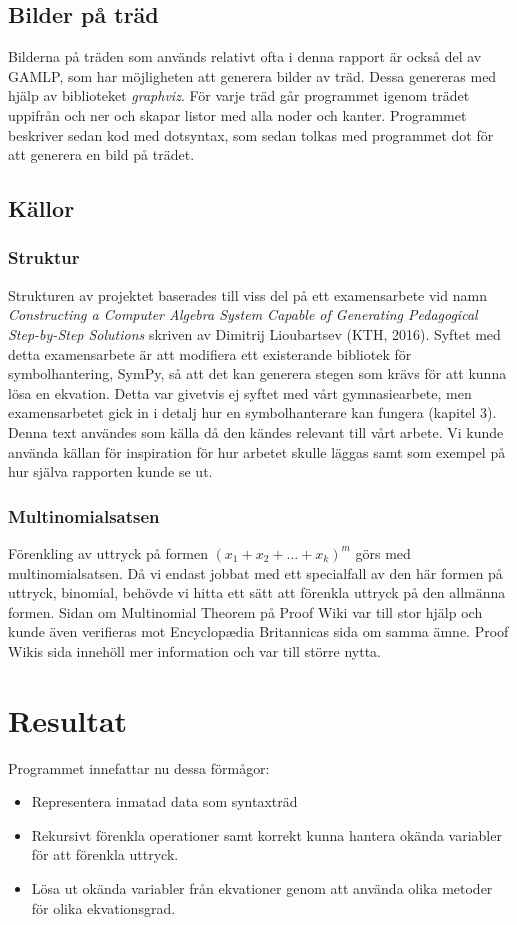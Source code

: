\documentclass[12pt,a4paper]{article}
\begin{document}
\subsection{Bilder på träd}
Bilderna på träden som används relativt ofta i denna rapport är också del av GAMLP, som har möjligheten att generera bilder av träd. Dessa genereras med hjälp av biblioteket \textit{graphviz}. För varje träd går programmet igenom trädet uppifrån och ner och skapar listor med alla noder och kanter. Programmet beskriver sedan kod med dotsyntax, som sedan tolkas med programmet dot för att generera en bild på trädet.

\subsection{Källor}
\subsubsection{Struktur}
Strukturen av projektet baserades till viss del på ett examensarbete vid namn \textit{Constructing a Computer Algebra System Capable of Generating Pedagogical Step-by-Step Solutions} skriven av Dimitrij Lioubartsev (KTH, 2016). Syftet med detta examensarbete är att modifiera ett existerande bibliotek för symbolhantering, SymPy, så att det kan generera stegen som krävs för att kunna lösa en ekvation. Detta var givetvis ej syftet med vårt gymnasiearbete, men examensarbetet gick in i detalj hur en symbolhanterare kan fungera (kapitel 3). Denna text användes som källa då den kändes relevant till vårt arbete. Vi kunde använda källan för inspiration för hur arbetet skulle läggas samt som exempel på hur själva rapporten kunde se ut.

\subsubsection{Multinomialsatsen}
Förenkling av uttryck på formen \((x_{1}+x_{2}+...+x_{k})^{m}\) görs med multinomialsatsen. Då vi endast jobbat med ett specialfall av den här formen på uttryck, binomial, behövde vi hitta ett sätt att förenkla uttryck på den allmänna formen. Sidan om Multinomial Theorem på Proof Wiki var till stor hjälp och kunde även verifieras mot Encyclopædia Britannicas sida om samma ämne. Proof Wikis sida innehöll mer information och var till större nytta.

\section{Resultat}
Programmet innefattar nu dessa förmågor:
\begin{itemize}
	\item Representera inmatad data som syntaxträd
	\item Rekursivt förenkla operationer samt korrekt kunna hantera okända variabler för att förenkla uttryck.
	\item Lösa ut okända variabler från ekvationer genom att använda olika metoder för olika ekvationsgrad.
\end{itemize}
\end{document}
